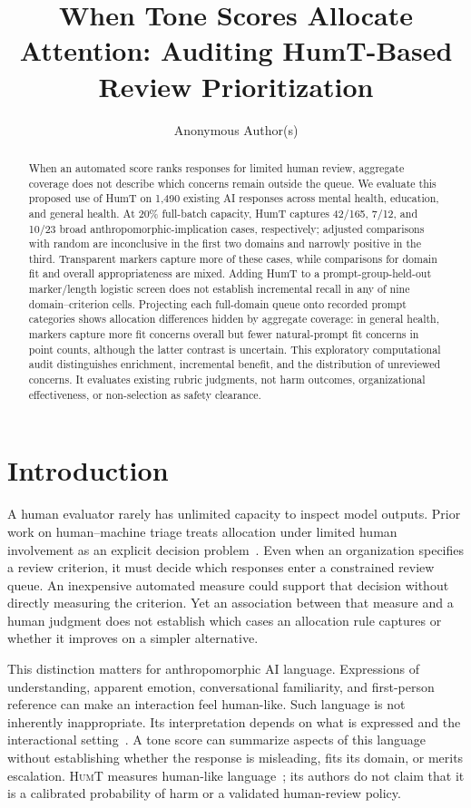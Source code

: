 \documentclass[manuscript,screen,review,anonymous]{acmart}
\title{When Tone Scores Allocate Attention: Auditing HumT-Based Review Prioritization}
\author{Anonymous Author(s)}
\newcommand{\HumT}{\textsc{HumT}}
\begin{document}
\begin{abstract}
When an automated score ranks responses for limited human review, aggregate coverage does not describe which concerns remain outside the queue. We evaluate this proposed use of HumT on 1,490 existing AI responses across mental health, education, and general health. At 20\% full-batch capacity, HumT captures 42/165, 7/12, and 10/23 broad anthropomorphic-implication cases, respectively; adjusted comparisons with random are inconclusive in the first two domains and narrowly positive in the third. Transparent markers capture more of these cases, while comparisons for domain fit and overall appropriateness are mixed. Adding HumT to a prompt-group-held-out marker/length logistic screen does not establish incremental recall in any of nine domain--criterion cells. Projecting each full-domain queue onto recorded prompt categories shows allocation differences hidden by aggregate coverage: in general health, markers capture more fit concerns overall but fewer natural-prompt fit concerns in point counts, although the latter contrast is uncertain. This exploratory computational audit distinguishes enrichment, incremental benefit, and the distribution of unreviewed concerns. It evaluates existing rubric judgments, not harm outcomes, organizational effectiveness, or non-selection as safety clearance.
\end{abstract}
\maketitle

\section{Introduction}
A human evaluator rarely has unlimited capacity to inspect model outputs. Prior work on human--machine triage treats allocation under limited human involvement as an explicit decision problem~\cite{okati2021triage}. Even when an organization specifies a review criterion, it must decide which responses enter a constrained review queue. An inexpensive automated measure could support that decision without directly measuring the criterion. Yet an association between that measure and a human judgment does not establish which cases an allocation rule captures or whether it improves on a simpler alternative.

This distinction matters for anthropomorphic AI language. Expressions of understanding, apparent emotion, conversational familiarity, and first-person reference can make an interaction feel human-like. Such language is not inherently inappropriate. Its interpretation depends on what is expressed and the interactional setting~\cite{devrio2025taxonomy,cheng2025dehumanizing}. A tone score can summarize aspects of this language without establishing whether the response is misleading, fits its domain, or merits escalation. \HumT{} measures human-like language~\cite{cheng2025humt}; its authors do not claim that it is a calibrated probability of harm or a validated human-review policy.
\end{document}
